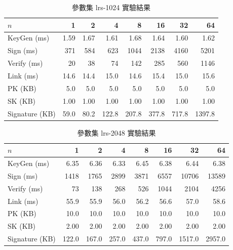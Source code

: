 \begin{table}[ht]
  \centering
  \begin{tabular}{lrrrrrrr}
    \toprule
    $n$ & 1 & 2 & 4 & 8 & 16 & 32 & 64 \\
    \midrule
    KeyGen (ms) & 1.59 & 1.67 & 1.61 & 1.68 & 1.64 & 1.60 & 1.62 \\
    Sign (ms) & 371 & 584 & 623 & 1044 & 2138 & 4160 & 5201 \\
    Verify (ms) & 20 & 38 & 74 & 142 & 285 & 560 & 1146 \\
    Link (ms) & 14.6 & 14.4 & 15.0 & 14.6 & 15.4 & 15.0 & 15.6 \\
    \midrule
    PK (KB) & 5.0 & 5.0 & 5.0 & 5.0 & 5.0 & 5.0 & 5.0 \\
    SK (KB) & 1.00 & 1.00 & 1.00 & 1.00 & 1.00 & 1.00 & 1.00 \\
    Signature (KB) & 59.0 & 80.2 & 122.8 & 207.8 & 377.8 & 717.8 & 1397.8 \\
    \bottomrule
  \end{tabular}
  \caption{參數集 lrs-1024 實驗結果}
  \label{tab:result-lrs-1024}
\end{table}

\begin{table}[ht]
  \centering
  \begin{tabular}{lrrrrrrr}
    \toprule
    $n$ & 1 & 2 & 4 & 8 & 16 & 32 & 64 \\
    \midrule
    KeyGen (ms) & 6.35 & 6.36 & 6.33 & 6.45 & 6.38 & 6.44 & 6.38 \\
    Sign (ms) & 1418 & 1765 & 2899 & 3871 & 6557 & 10706 & 13589 \\
    Verify (ms) & 73 & 138 & 268 & 526 & 1044 & 2104 & 4256 \\
    Link (ms) & 55.9 & 55.9 & 56.0 & 56.2 & 56.6 & 57.0 & 58.6 \\
    \midrule
    PK (KB) & 10.0 & 10.0 & 10.0 & 10.0 & 10.0 & 10.0 & 10.0 \\
    SK (KB) & 2.00 & 2.00 & 2.00 & 2.00 & 2.00 & 2.00 & 2.00 \\
    Signature (KB) & 122.0 & 167.0 & 257.0 & 437.0 & 797.0 & 1517.0 & 2957.0 \\
    \bottomrule
  \end{tabular}
  \caption{參數集 lrs-2048 實驗結果}
  \label{tab:result-lrs-2048}
\end{table}
